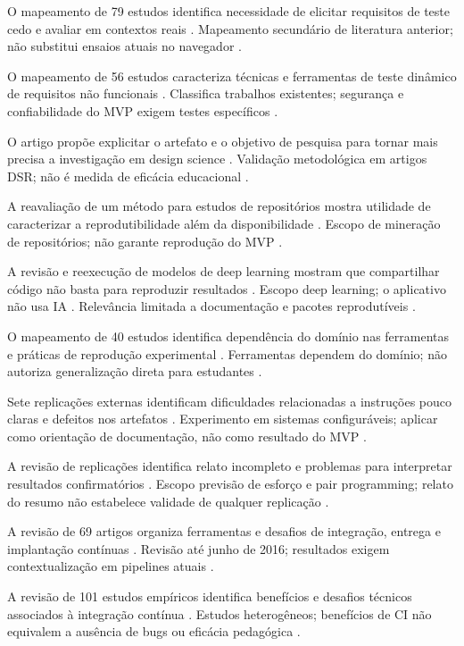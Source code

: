 O mapeamento de 79 estudos identifica necessidade de elicitar requisitos de teste cedo e avaliar em contextos reais \citep{eng05}. Mapeamento secundário de literatura anterior; não substitui ensaios atuais no navegador \citep{eng05}.

O mapeamento de 56 estudos caracteriza técnicas e ferramentas de teste dinâmico de requisitos não funcionais \citep{eng06}. Classifica trabalhos existentes; segurança e confiabilidade do MVP exigem testes específicos \citep{eng06}.

O artigo propõe explicitar o artefato e o objetivo de pesquisa para tornar mais precisa a investigação em design science \citep{eng07}. Validação metodológica em artigos DSR; não é medida de eficácia educacional \citep{eng07}.

A reavaliação de um método para estudos de repositórios mostra utilidade de caracterizar a reprodutibilidade além da disponibilidade \citep{eng08}. Escopo de mineração de repositórios; não garante reprodução do MVP \citep{eng08}.

A revisão e reexecução de modelos de deep learning mostram que compartilhar código não basta para reproduzir resultados \citep{eng10}. Escopo deep learning; o aplicativo não usa IA \citep{eng10}. Relevância limitada a documentação e pacotes reprodutíveis \citep{eng10}.

O mapeamento de 40 estudos identifica dependência do domínio nas ferramentas e práticas de reprodução experimental \citep{eng11}. Ferramentas dependem do domínio; não autoriza generalização direta para estudantes \citep{eng11}.

Sete replicações externas identificam dificuldades relacionadas a instruções pouco claras e defeitos nos artefatos \citep{eng12}. Experimento em sistemas configuráveis; aplicar como orientação de documentação, não como resultado do MVP \citep{eng12}.

A revisão de replicações identifica relato incompleto e problemas para interpretar resultados confirmatórios \citep{eng13}. Escopo previsão de esforço e pair programming; relato do resumo não estabelece validade de qualquer replicação \citep{eng13}.

A revisão de 69 artigos organiza ferramentas e desafios de integração, entrega e implantação contínuas \citep{eng14}. Revisão até junho de 2016; resultados exigem contextualização em pipelines atuais \citep{eng14}.

A revisão de 101 estudos empíricos identifica benefícios e desafios técnicos associados à integração contínua \citep{eng15}. Estudos heterogêneos; benefícios de CI não equivalem a ausência de bugs ou eficácia pedagógica \citep{eng15}.

